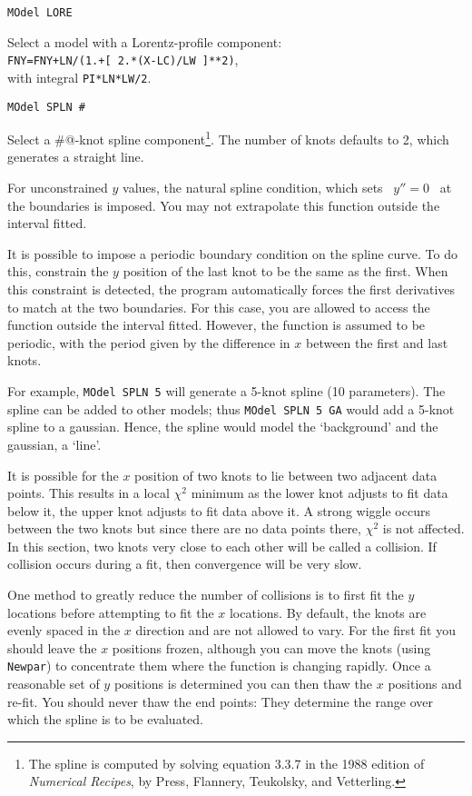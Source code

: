 \medskip\begin{verbatim}
MOdel LORE
\end{verbatim}
Select a model with a Lorentz-profile component:\\
{\tt FNY=FNY+LN/(1.+[ 2.*(X-LC)/LW ]**2)},\\
with integral {\tt PI*LN*LW/2}.

\medskip\begin{verbatim}
MOdel SPLN #
\end{verbatim}
Select a \verb@#@-knot spline component\footnote{
The spline is computed by solving equation 3.3.7 in the 1988 edition of
{\it Numerical Recipes}, by Press, Flannery, Teukolsky, and
Vetterling.}.
The number of knots defaults to 2, which generates a straight line.

For unconstrained $y$ values, the natural spline condition,
which sets \, $y''= 0$ \, at the boundaries is imposed.  You may not
extrapolate this function outside the interval fitted.

It is possible to impose a periodic boundary condition on the spline
curve.  To do this, constrain the $y$ position of the last knot to be
the same as the first.  When this constraint is detected, the program
automatically forces the first derivatives to match at the two
boundaries.  For this case, you are allowed to access the function
outside the interval fitted.  However, the function is assumed to be
periodic, with the period given by the difference in $x$ between the
first and last knots.

For example, {\tt MOdel SPLN 5} will generate a 5-knot spline (10
parameters).  The spline can be added to other models; thus
{\tt MOdel SPLN 5 GA} would add a 5-knot spline to a gaussian.  Hence,
the spline would model the `background' and the gaussian, a `line'.

It is possible for the $x$ position of two knots to lie between two
adjacent data points.  This results in a local $\chi^2$ minimum as the
lower knot adjusts to fit data below it, the upper knot adjusts to
fit data above it.  A strong wiggle occurs between the two knots but
since there are no data points there, $\chi^2$ is not affected.  In this
section, two knots very close to each other will be called a collision.
If collision occurs during a fit, then convergence will be very slow.

One method to greatly reduce the number of collisions is to first
fit the $y$ locations before attempting to fit the $x$ locations.  By
default, the knots are evenly spaced in the $x$ direction and are not
allowed to vary.  For the first fit you should leave the $x$ positions
frozen, although you can move the knots (using {\tt Newpar}) to concentrate
them where the function is changing rapidly.  Once a reasonable set
of $y$ positions is determined you can then thaw the $x$ positions and
re-fit.  You should never thaw the end points:  They determine the
range over which the spline is to be evaluated.

